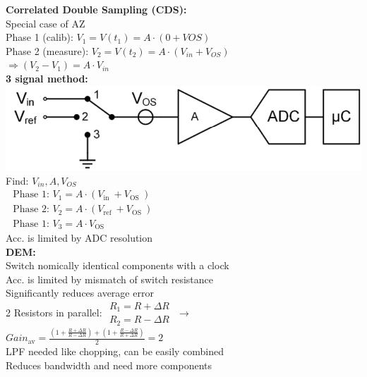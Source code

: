 \documentclass[5pt,landscape]{article}
\begin{document}
\begin{multicols*}{5}
\textbf{Correlated Double Sampling (CDS):}\\
Special case of AZ\\
Phase 1 (calib): $ V_1 = V(t_1) = A \cdot (0 + VOS) $\\
Phase 2 (measure): $ V_2 = V(t_2) = A \cdot (V_{in} + V_{OS}) $\\
$\Rightarrow (V_2 - V_1 ) = A \cdot V_{in} $\\
\textbf{3 signal method:}\\
\includegraphics[width=\columnwidth]{images/3signal_method.png}\\
Find: $ V_{in} , A , V_{OS} $\\
$ \begin{array}{l}
\text { Phase 1: } V_{1}=A \cdot\left(V_{\text {in }}+V_{\text {OS }}\right) \\
\text { Phase 2: } V_{2}=A \cdot\left(V_{\text {ref }}+V_{\text {OS }}\right) \\
\text { Phase 1: } V_{3}=A \cdot V_{\text {OS }}
\end{array} $\\
Acc. is limited by ADC resolution\\
\textbf{DEM:}\\
Switch nomically identical components with a clock\\
Acc. is limited by mismatch of switch resistance\\
Significantly reduces average error\\
2 Resistors in parallel:
$ \begin{array}{l}
R_{1}=R+\Delta R \\
R_{2}=R-\Delta R
\end{array} $ $ \rightarrow $\\
$ Gain_{\mathrm{av}}=\frac{\left(1+\frac{R+\Delta R}{R-\Delta R}\right)+\left(1+\frac{R-\Delta R}{R+\Delta R}\right)}{2}=2 $\\
LPF needed like chopping, can be easily combined\\
Reduces bandwidth and need more components

\end{multicols*}
\end{document}

